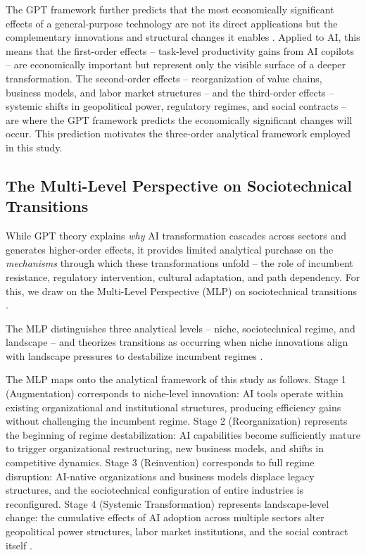 \documentclass[preprint,review,12pt]{elsarticle}
\begin{document}
The GPT framework further predicts that the most economically significant effects of a general-purpose technology are not its direct applications but the complementary innovations and structural changes it enables \citep{bresnahan1995gpt, korzinov2018gpt, coccia2018longwaves}. Applied to AI, this means that the first-order effects -- task-level productivity gains from AI copilots -- are economically important but represent only the visible surface of a deeper transformation. The second-order effects -- reorganization of value chains, business models, and labor market structures -- and the third-order effects -- systemic shifts in geopolitical power, regulatory regimes, and social contracts -- are where the GPT framework predicts the economically significant changes will occur. This prediction motivates the three-order analytical framework employed in this study.



\subsection{The Multi-Level Perspective on Sociotechnical Transitions}
\label{sec:mlp}

While GPT theory explains \textit{why} AI transformation cascades across sectors and generates higher-order effects, it provides limited analytical purchase on the \textit{mechanisms} through which these transformations unfold -- the role of incumbent resistance, regulatory intervention, cultural adaptation, and path dependency. For this, we draw on the Multi-Level Perspective (MLP) on sociotechnical transitions \citep{geels2005coevolutionary, geels2011multilevel, geels2020microfoundations}.

The MLP distinguishes three analytical levels -- niche, sociotechnical regime, and landscape -- and theorizes transitions as occurring when niche innovations align with landscape pressures to destabilize incumbent regimes \citep{geels2011multilevel, roberts2019accelerated}.

The MLP maps onto the analytical framework of this study as follows. Stage 1 (Augmentation) corresponds to niche-level innovation: AI tools operate within existing organizational and institutional structures, producing efficiency gains without challenging the incumbent regime. Stage 2 (Reorganization) represents the beginning of regime destabilization: AI capabilities become sufficiently mature to trigger organizational restructuring, new business models, and shifts in competitive dynamics. Stage 3 (Reinvention) corresponds to full regime disruption: AI-native organizations and business models displace legacy structures, and the sociotechnical configuration of entire industries is reconfigured. Stage 4 (Systemic Transformation) represents landscape-level change: the cumulative effects of AI adoption across multiple sectors alter geopolitical power structures, labor market institutions, and the social contract itself \citep{geels2020microfoundations, geels2020scenarios, walrave2018mlp}.
\end{document}
